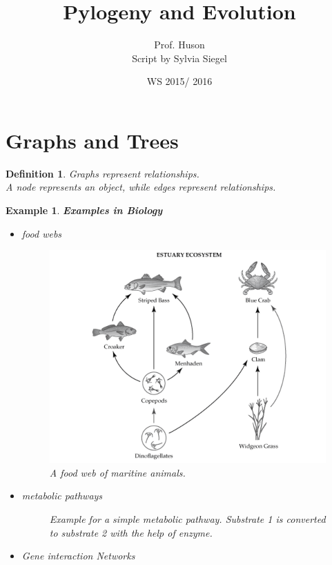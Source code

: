 \documentclass[10pt,a4paper]{article}
\author{Prof. Huson \\
	Script by Sylvia Siegel}
\title{	Pylogeny and Evolution }
\date {WS 2015/ 2016}
\newtheorem {defi}{Definition}[section]
\newtheorem{eg}{Example}[section]
\begin{document}
\maketitle 
\section{Graphs and Trees}
\begin{defi}
Graphs represent relationships. \\
A node represents an object, while edges represent relationships. 

\end{defi}
\begin{eg}{\textbf{Examples in Biology}}
	\begin{itemize}
		\item food webs
\begin{figure}[h"]
	\centering
	\includegraphics[width = 0.4 \textwidth]{pictures/foodweb}
	\caption[Food web]{
		\centering
		A food web of maritine animals. 
		}
	\label{fig:foodweb}
\end{figure}

\item metabolic pathways 
	\begin{figure} [h!]
		\centering
		\label{fig: methabolicPathway}
		\caption{Example for a simple metabolic pathway. Substrate 1 is converted to substrate 2 with the help of enzyme. }
	\end{figure}
\item Gene interaction Networks
	\begin{figure} [h!]
		\centering
\end{figure}
\end{itemize}
\end{eg}
\end{document}
